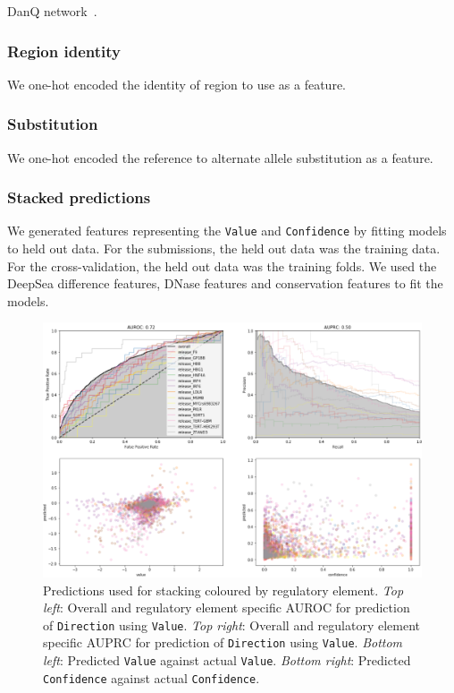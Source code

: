 \documentclass{article}
\begin{document}
DanQ network~\cite{QuangDanQhybridconvolutional2016}.


\subsubsection*{Region identity}

We one-hot encoded the identity of region to use as a feature.


\subsubsection*{Substitution}

We one-hot encoded the reference to alternate allele substitution as a feature.


\subsubsection*{Stacked predictions}

We generated features representing the \texttt{Value} and \texttt{Confidence}
by fitting models to held out data. For the submissions, the held out data was
the training data. For the cross-validation, the held out data was the training
folds. We used the DeepSea difference features, DNase features and conservation
features to fit the models.

\begin{figure}
\includegraphics[width=\textwidth]{fig-stacking-x-validation}
\caption{Predictions used for stacking coloured by regulatory element.
  \emph{Top left}: Overall and regulatory element specific AUROC for prediction
  of \texttt{Direction} using \texttt{Value}.
  \emph{Top right}: Overall and regulatory element specific AUPRC for prediction
  of \texttt{Direction} using \texttt{Value}.
  \emph{Bottom left}: Predicted \texttt{Value} against actual \texttt{Value}.
  \emph{Bottom right}: Predicted \texttt{Confidence} against actual \texttt{Confidence}.
}
\label{fig:stacking}
\end{figure}
\end{document}
